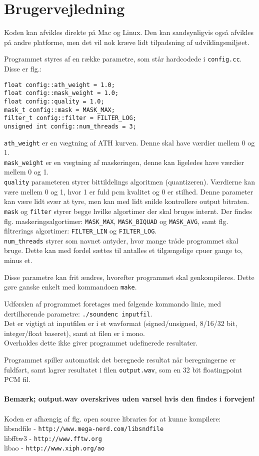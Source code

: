 \section{Brugervejledning}
Koden kan afvikles direkte på Mac og Linux. Den kan sandsynligvis også
afvikles på andre platforme, men det vil nok kræve lidt tilpadsning af
udviklingsmiljøet.

Programmet styres af en række parametre, som står hardcodede i
\verb|config.cc|. Disse er flg.:
\begin{verbatim}
float config::ath_weight = 1.0;
float config::mask_weight = 1.0;
float config::quality = 1.0;
mask_t config::mask = MASK_MAX;
filter_t config::filter = FILTER_LOG;
unsigned int config::num_threads = 3;
\end{verbatim}
\verb|ath_weight| er en vægtning af ATH kurven. Denne skal have
værdier mellem 0 og 1.\\
\verb|mask_weight| er en vægtning af maskeringen, denne kan ligeledes
have værdier mellem 0 og 1.\\
\verb|quality| parameteren styrer bittildelings algoritmen
(quantizeren). Værdierne kan være mellem 0 og 1, hvor 1 er fuld pcm
kvalitet og 0 er stilhed. Denne parameter kan være lidt svær at tyre,
men kan med lidt snilde kontrollere output bitraten.\\
\verb|mask| og \verb|filter| styrer begge hvilke algortimer der skal
bruges internt. Der findes flg. maskeringsalgortimer: \verb|MASK_MAX|,
\verb|MASK_BIQUAD| og \verb|MASK_AVG|, samt flg. filtrerings
algortimer: \verb|FILTER_LIN| og \verb|FILTER_LOG|.\\
\verb|num_threads| styrer som navnet antyder, hvor mange tråde
programmet skal bruge. Dette kan med fordel sættes til antalles et
tilgængelige cpuer gange to, minus et.

Disse parametre kan frit ændres, hvorefter programmet skal
genkompileres. Dette gøre ganske enkelt med kommandoen \verb|make|.

Udførslen af programmet foretages med følgende kommando linie, med
dertilhørende parametre: \verb|./soundenc inputfil|.\\
Det er vigtigt at inputfilen er i et wavformat (signed/unsigned,
8/16/32 bit, integer/float baseret), samt at filen er i mono.\\
Overholdes dette ikke giver programmet udefinerede resultater.

Programmet spiller automatisk det beregnede resultat når beregningerne
er fuldført, samt lagrer resultatet i filen \verb|output.wav|, som en 32
bit floatingpoint PCM fil.\\
\\
\textbf{Bemærk; output.wav overskrives uden varsel hvis den findes i
  forvejen!}\\
\\
Koden er afhængig af flg. open source libraries for at kunne kompilere:\\
libsndfile - \verb|http://www.mega-nerd.com/libsndfile|\\
libfftw3 - \verb|http://www.fftw.org|\\
libao - \verb|http://www.xiph.org/ao|
